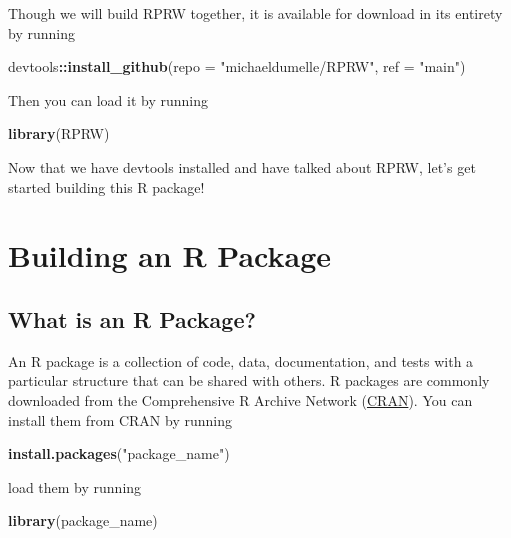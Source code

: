 \documentclass[
]{book}
\newenvironment{Shaded}{\begin{snugshade}}{\end{snugshade}}
\newcommand{\DataTypeTok}[1]{\textcolor[rgb]{0.13,0.29,0.53}{#1}}
\newcommand{\KeywordTok}[1]{\textcolor[rgb]{0.13,0.29,0.53}{\textbf{#1}}}
\newcommand{\NormalTok}[1]{#1}
\newcommand{\OperatorTok}[1]{\textcolor[rgb]{0.81,0.36,0.00}{\textbf{#1}}}
\newcommand{\StringTok}[1]{\textcolor[rgb]{0.31,0.60,0.02}{#1}}
\begin{document}
Though we will build RPRW together, it is available for download in its entirety by running

\begin{Shaded}
\begin{Highlighting}[]
\NormalTok{devtools}\OperatorTok{::}\KeywordTok{install_github}\NormalTok{(}\DataTypeTok{repo =} \StringTok{"michaeldumelle/RPRW"}\NormalTok{, }\DataTypeTok{ref =} \StringTok{"main"}\NormalTok{)}
\end{Highlighting}
\end{Shaded}

Then you can load it by running

\begin{Shaded}
\begin{Highlighting}[]
\KeywordTok{library}\NormalTok{(RPRW)}
\end{Highlighting}
\end{Shaded}

Now that we have devtools installed and have talked about RPRW, let's get started building this R package!

\hypertarget{r-package}{%
\chapter{Building an R Package}\label{r-package}}

\hypertarget{what-is-an-r-package}{%
\section{What is an R Package?}\label{what-is-an-r-package}}

An R package is a collection of code, data, documentation, and tests with a particular structure that can be shared with others. R packages are commonly downloaded from the Comprehensive R Archive Network (\href{https://cran.r-project.org/}{CRAN}). You can install them from CRAN by running

\begin{Shaded}
\begin{Highlighting}[]
\KeywordTok{install.packages}\NormalTok{(}\StringTok{"package_name"}\NormalTok{)}
\end{Highlighting}
\end{Shaded}

load them by running

\begin{Shaded}
\begin{Highlighting}[]
\KeywordTok{library}\NormalTok{(package_name)}
\end{Highlighting}
\end{Shaded}
\end{document}
